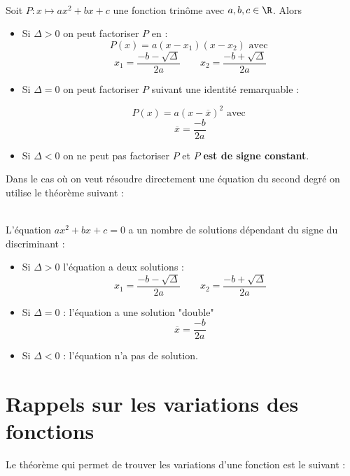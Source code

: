 \documentclass[12pt,fleqn]{report} %
\begin{document}
\begin{theorem}\text{ }\\
	Soit $P : x \mapsto a x^2 + bx + c$ une fonction trinôme avec $a,b,c \in \R$.
	Alors \begin{itemize}
		\item Si $\Delta >0$ on peut factoriser $P$ en : \[
		P(x) = a (x - x_1)(x - x_2) \text{ avec }
		\]
		\[
		x_1 = \frac{-b - \sqrt{\Delta}}{2a} \qquad x_2 = \frac{-b + \sqrt{\Delta}}{2a}
		\]
		
		\item Si $\Delta = 0$ on peut factoriser $P$ suivant une identité remarquable : 
		
		\[
		P(x) = a\left( x - \overline{x} \right)^2 \text{ avec }
		\]
		\[
		\overline{x} = \frac{-b}{2a}
		\]
		\item Si $\Delta <0$ on ne peut pas factoriser $P$ et $P$ \textbf{est de signe constant}.
	\end{itemize}
\end{theorem}
Dans le cas où on veut résoudre directement une équation du second degré on utilise le théorème suivant : 
\begin{theorem}\text{ }\\
	L'équation $ax^2 + bx + c = 0$ a un nombre de solutions dépendant du signe du discriminant : 
	\begin{itemize}
		\item Si $\Delta >0$ l'équation a deux solutions : \[
		x_1 = \frac{-b - \sqrt{\Delta}}{2a} \qquad x_2 = \frac{-b + \sqrt{\Delta}}{2a}
		\]
		\item Si $\Delta = 0$ : l'équation a une solution "double" \[
		\overline{x} = \frac{-b}{2a}
		\]
		\item Si $\Delta < 0$ : l'équation n'a pas de solution.
	\end{itemize}
\end{theorem}

\section{Rappels sur les variations des fonctions}
Le théorème qui permet de trouver les variations d'une fonction est le suivant :
\end{document}
